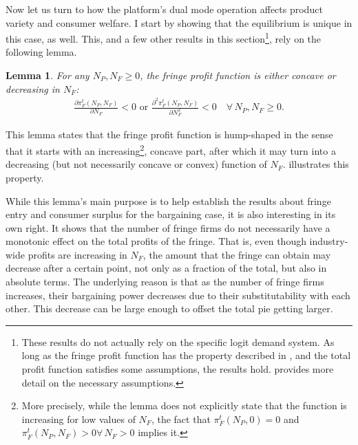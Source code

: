 \documentclass[a4paper]{article}
\newtheorem{lemma}{Lemma}
\begin{document}
Now let us turn to how the platform's dual mode operation affects product variety and consumer welfare.
I start by showing that the equilibrium is unique in this case, as well.
This, and a few other results in this section\footnote{
    These results do not actually rely on the specific logit demand system.
    As long as the fringe profit function has the property described in , and the total profit function satisfies some assumptions, the results hold.
     provides more detail on the necessary assumptions.
}, rely on the following lemma.
\begin{lemma}
    \label{lem:shape_of_fringe_profit}
    For any $N_P, N_F \geq 0$, the fringe profit function is either concave or decreasing in $N_F$:
    \begin{align*}
        \frac{\partial \pi_F^t(N_P, N_F)}{\partial N_F} < 0 \text{ or } \frac{\partial^2 \pi_F^t(N_P, N_F)}{\partial N_F^2} < 0 \quad \forall\, N_P, N_F \geq 0.
    \end{align*}
\end{lemma}
This lemma states that the fringe profit function is hump-shaped in the sense that it starts with an increasing\footnote{
    More precisely, while the lemma does not explicitly state that the function is increasing for low values of $N_F$, the fact that $\pi_F^t(N_P, 0) = 0$ and $\pi_F^t(N_P, N_F) > 0 \forall\, N_F > 0$ implies it.
}, concave part, after which it may turn into a decreasing (but not necessarily concave or convex) function of $N_F$.
 illustrates this property.

While this lemma's main purpose is to help establish the results about fringe entry and consumer surplus for the bargaining case, it is also interesting in its own right.
It shows that the number of fringe firms do not necessarily have a monotonic effect on the total profits of the fringe.
That is, even though industry-wide profits are increasing in $N_F$, the amount that the fringe can obtain may decrease after a certain point, not only as a fraction of the total, but also in absolute terms.
The underlying reason is that as the number of fringe firms increases, their bargaining power decreases due to their substitutability with each other.
This decrease can be large enough to offset the total pie getting larger.
\end{document}
